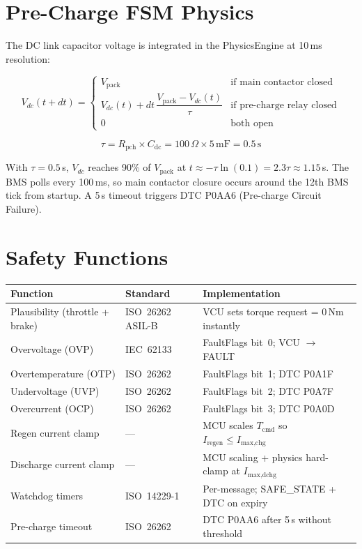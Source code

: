 \documentclass[12pt, a4paper, openany]{report}
\begin{document}
\section{Pre-Charge FSM Physics}

The DC link capacitor voltage is integrated in the PhysicsEngine at
10\,ms resolution:

\[
  V_{dc}(t+dt) = \begin{cases}
    V_\text{pack} & \text{if main contactor closed} \\
    V_{dc}(t) + dt\,\dfrac{V_\text{pack} - V_{dc}(t)}{\tau}
      & \text{if pre-charge relay closed} \\
    0 & \text{both open}
  \end{cases}
\]

\[
  \tau = R_\text{pch} \times C_\text{dc} = 100\,\Omega \times 5\,\text{mF}
       = 0.5\,\text{s}
\]

With $\tau = 0.5$\,s, $V_{dc}$ reaches 90\% of $V_\text{pack}$ at
$t \approx -\tau\ln(0.1) = 2.3\tau \approx 1.15$\,s. The BMS polls every
100\,ms, so main contactor closure occurs around the 12th BMS tick from
startup. A 5\,s timeout triggers DTC P0AA6 (Pre-charge Circuit Failure).

\section{Safety Functions}

\begin{table}[!ht]
\centering\small
\begin{tabularx}{\textwidth}{llX}
  \toprule
  \rowcolor{TblHead}
  \color{white}\textbf{Function} &
  \color{white}\textbf{Standard} &
  \color{white}\textbf{Implementation} \\
  \midrule
  Plausibility (throttle + brake)
    & ISO~26262 ASIL-B
    & VCU sets torque request = 0\,Nm instantly \\
  \rowcolor{TblAlt}
  Overvoltage (OVP)
    & IEC~62133
    & FaultFlags bit~0; VCU $\to$ FAULT \\
  Overtemperature (OTP)
    & ISO~26262
    & FaultFlags bit~1; DTC P0A1F \\
  \rowcolor{TblAlt}
  Undervoltage (UVP)
    & ISO~26262
    & FaultFlags bit~2; DTC P0A7F \\
  Overcurrent (OCP)
    & ISO~26262
    & FaultFlags bit~3; DTC P0A0D \\
  \rowcolor{TblAlt}
  Regen current clamp
    & ---
    & MCU scales $T_\text{cmd}$ so $I_\text{regen} \leq I_\text{max,chg}$ \\
  Discharge current clamp
    & ---
    & MCU scaling + physics hard-clamp at $I_\text{max,dchg}$ \\
  \rowcolor{TblAlt}
  Watchdog timers
    & ISO~14229-1
    & Per-message; SAFE\_STATE + DTC on expiry \\
  Pre-charge timeout
    & ISO~26262
    & DTC P0AA6 after 5\,s without threshold \\
  \bottomrule
\end{tabularx}
\end{table}
\end{document}
